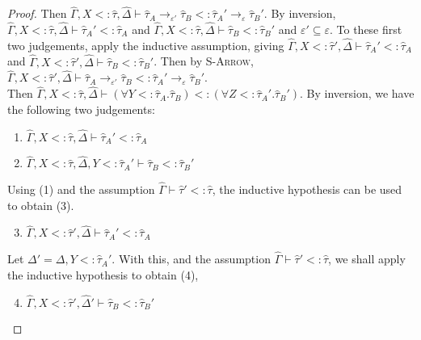\documentclass{llncs}
\begin{document}
\begin{proof}
 Then $\hat \Gamma, X <: \hat \tau, \hat \Delta \vdash \hat \tau_A \rightarrow_{\varepsilon'} \hat \tau_B <: \hat \tau_A' \rightarrow_{\varepsilon} \hat \tau_B'$. By inversion, $\hat \Gamma, X <: \hat \tau, \hat \Delta \vdash \hat \tau_A' <: \hat \tau_A$ and $\hat \Gamma, X <: \hat \tau, \hat \Delta \vdash \hat \tau_B <: \hat \tau_B'$ and $\varepsilon' \subseteq \varepsilon$. To these first two judgements, apply the inductive assumption, giving $\hat \Gamma, X <: \hat \tau', \hat \Delta \vdash \hat \tau_A' <: \hat \tau_A$ and $\hat \Gamma, X <: \hat \tau', \hat \Delta \vdash \hat \tau_B <: \hat \tau_B'$. Then by \textsc{S-Arrow}, $\hat \Gamma, X <: \hat \tau', \hat \Delta \vdash \hat \tau_A \rightarrow_{\varepsilon'} \hat \tau_B <: \hat \tau_A' \rightarrow_{\varepsilon} \hat \tau_B'$.\\

 Then $\hat \Gamma, X <: \hat \tau, \hat \Delta \vdash (\forall Y <: \hat \tau_A. \hat \tau_B) <: (\forall Z <: \hat \tau_A'. \hat \tau_B')$. By inversion, we have the following two judgements:

\begin{enumerate}
	\item $\hat \Gamma, X <: \hat \tau, \hat \Delta \vdash \hat \tau_A' <: \hat \tau_A$
	\item $\hat \Gamma, X <: \hat \tau, \hat \Delta, Y <: \hat \tau_A' \vdash \hat \tau_B <: \hat \tau_B'$
\end{enumerate}

Using (1) and the assumption $\hat \Gamma \vdash \hat \tau' <: \hat \tau$, the inductive hypothesis can be used to obtain (3).

\begin{enumerate}

  \setcounter{enumi}{2}
	\item $\hat \Gamma, X <: \hat \tau', \hat \Delta \vdash \hat \tau_A' <: \hat \tau_A$

\end{enumerate}

Let $\Delta' = \Delta, Y <:  \hat \tau_A'$. With this, and the assumption $\hat \Gamma \vdash \hat \tau' <: \hat \tau$, we shall apply the inductive hypothesis to obtain (4),

\begin{enumerate}
	\setcounter{enumi}{3}
	\item $\hat \Gamma, X <: \hat \tau', \hat \Delta' \vdash \hat \tau_B <: \hat \tau_B'$ 
\end{enumerate}


\end{proof}
\end{document}
